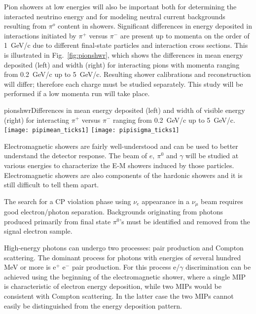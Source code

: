 \begin{description}
Pion showers at low energies will also be important both for determining the interacted neutrino energy and for modeling neutral current backgrounds resulting from $\pi^o$ content in showers. Significant
 differences in energy deposited in interactions initiated by $\pi^+$ versus $\pi^-$  are present up to momenta on the order of 1~GeV/c due to different
final-state particles and interaction cross sections. This is illustrated in 
Fig.~\ref{fig:pionshwr}, which shows the differences in mean energy deposited (left) and width (right) 
for interacting pions with momenta ranging from 0.2~GeV/c up to 5~GeV/c.
Resulting shower calibrations and reconstruction will differ; therefore each charge must be 
studied separately. This study will be performed if a low momenta run will take place.  

\begin{cdrfigure}{pionshwr}{Differences in mean energy deposited (left) and width of visible energy (right) 
for interacting $\pi^+$ versus $\pi^-$ ranging from 0.2~GeV/c up to 5~GeV/c. }
\texttt{[image: pipimean\_ticks1]}
\texttt{[image: pipisigma\_ticks1]}
\end{cdrfigure}


\item [Characterization of electromagnetic showers]

Electromagnetic showers are fairly well-understood and can be used to better understand the detector response. The beam of $e,\  \pi^0$ and $\gamma$ will be studied at various energies to characterize the E-M showers induced by those particles. Electromagnetic showers are also components of the hardonic showers and it is still difficult to tell them apart. 

\item [Study of $e/\gamma$ separation capabilities]

The search for a CP violation phase using $\nu_e$ appearance 
in a $\nu_\mu$ beam requires good electron/photon separation.
Backgrounds originating from photons produced primarily from 
final state $\pi^0$'s must be identified and removed from the signal
electron sample. 

High-energy photons can undergo two processes: pair production and Compton scattering. 
The dominant process for photons with energies of several hundred MeV or more is 
e$^+$ e$^-$ pair production.
For this process e/$\gamma$ discrimination
 can be achieved using the beginning of the electromagnetic shower, where 
a single MIP is characteristic of electron energy deposition, while two MIPs would be consistent 
with Compton scattering. %
In the latter case %
the two MIPs cannot easily be distinguished
from the energy deposition pattern.


\end{description}
